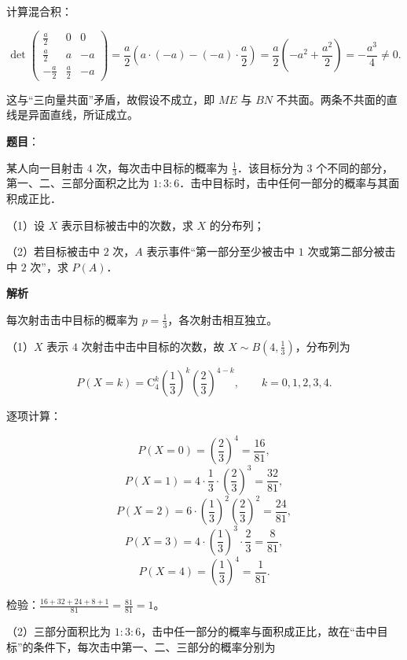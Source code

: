 \begin{answer}
计算混合积：

\nopagebreak[4]
\[\det
\begin{pmatrix}
\frac a2&0&0\\
\frac a2&a&-a\\
-\frac a2&\frac a2&-a
\end{pmatrix}
=\frac a2\left(a\cdot(-a)-(-a)\cdot\frac a2\right)
=\frac a2\left(-a^2+\frac{a^2}{2}\right)
=-\frac{a^3}{4}\neq0 .\]

这与“三向量共面”矛盾，故假设不成立，即 $ME$ 与 $BN$ 不共面。两条不共面的直线是异面直线，所证成立。


\end{answer}
\begin{answer}

\textbf{题目}：

某人向一目射击 $4$ 次，每次击中目标的概率为 $\frac13$．该目标分为 $3$ 个不同的部分，第一、二、三部分面积之比为 $1:3:6$．击中目标时，击中任何一部分的概率与其面积成正比．

（1）设 $X$ 表示目标被击中的次数，求 $X$ 的分布列；

（2）若目标被击中 $2$ 次，$A$ 表示事件“第一部分至少被击中 $1$ 次或第二部分被击中 $2$ 次”，求 $P(A)$．

\textbf{解析}

每次射击击中目标的概率为 $p=\frac13$，各次射击相互独立。

（1）$X$ 表示 $4$ 次射击中击中目标的次数，故 $X\sim B\left(4,\frac13\right)$，分布列为

\nopagebreak[4]
\[P(X=k)=\mathrm C_4^k\left(\frac13\right)^k\left(\frac23\right)^{4-k},
\qquad k=0,1,2,3,4 .\]

逐项计算：

\nopagebreak[4]
\[P(X=0)=\left(\frac23\right)^4=\frac{16}{81},\]
\nopagebreak[4]
\[P(X=1)=4\cdot\frac13\cdot\left(\frac23\right)^3=\frac{32}{81},\]
\nopagebreak[4]
\[P(X=2)=6\cdot\left(\frac13\right)^2\left(\frac23\right)^2=\frac{24}{81},\]
\nopagebreak[4]
\[P(X=3)=4\cdot\left(\frac13\right)^3\cdot\frac23=\frac{8}{81},\]
\nopagebreak[4]
\[P(X=4)=\left(\frac13\right)^4=\frac{1}{81}.\]

检验：$\frac{16+32+24+8+1}{81}=\frac{81}{81}=1$。

（2）三部分面积比为 $1:3:6$，击中任一部分的概率与面积成正比，故在“击中目标”的条件下，每次击中第一、二、三部分的概率分别为


\end{answer}
